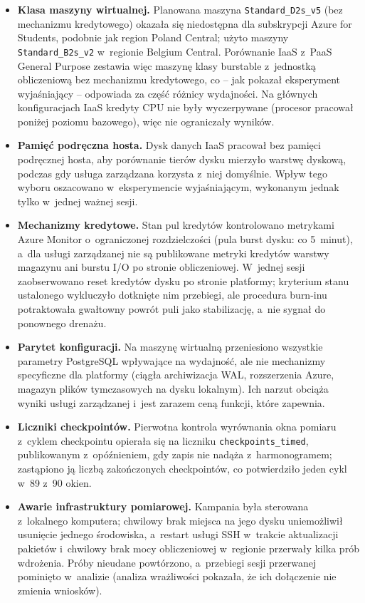 \begin{itemize}
  \item \textbf{Klasa maszyny wirtualnej.} Planowana maszyna \texttt{Standard\_D2s\_v5}
  (bez mechanizmu kredytowego) okazała się niedostępna dla subskrypcji Azure for Students,
  podobnie jak region Poland Central; użyto maszyny \texttt{Standard\_B2s\_v2} w~regionie
  Belgium Central. Porównanie IaaS z~PaaS General Purpose zestawia więc maszynę klasy
  burstable z~jednostką obliczeniową bez mechanizmu kredytowego, co -- jak pokazał
  eksperyment wyjaśniający -- odpowiada za część różnicy wydajności. Na głównych
  konfiguracjach IaaS kredyty CPU nie były wyczerpywane (procesor pracował poniżej poziomu
  bazowego), więc nie ograniczały wyników.
  \item \textbf{Pamięć podręczna hosta.} Dysk danych IaaS pracował bez pamięci podręcznej
  hosta, aby porównanie tierów dysku mierzyło warstwę dyskową, podczas gdy usługa zarządzana
  korzysta z~niej domyślnie. Wpływ tego wyboru oszacowano w~eksperymencie wyjaśniającym,
  wykonanym jednak tylko w~jednej ważnej sesji.
  \item \textbf{Mechanizmy kredytowe.} Stan pul kredytów kontrolowano metrykami Azure Monitor
  o~ograniczonej rozdzielczości (pula burst dysku: co 5~minut), a~dla usługi zarządzanej nie
  są publikowane metryki kredytów warstwy magazynu ani burstu I/O po stronie obliczeniowej.
  W~jednej sesji zaobserwowano reset kredytów dysku po stronie platformy; kryterium stanu
  ustalonego wykluczyło dotknięte nim przebiegi, ale procedura burn-inu potraktowała gwałtowny
  powrót puli jako stabilizację, a~nie sygnał do ponownego drenażu.
  \item \textbf{Parytet konfiguracji.} Na maszynę wirtualną przeniesiono wszystkie parametry
  PostgreSQL wpływające na wydajność, ale nie mechanizmy specyficzne dla platformy (ciągła
  archiwizacja WAL, rozszerzenia Azure, magazyn plików tymczasowych na dysku lokalnym). Ich
  narzut obciąża wyniki usługi zarządzanej i~jest zarazem ceną funkcji, które zapewnia.
  \item \textbf{Liczniki checkpointów.} Pierwotna kontrola wyrównania okna pomiaru z~cyklem
  checkpointu opierała się na liczniku \texttt{checkpoints\_timed}, publikowanym z~opóźnieniem,
  gdy zapis nie nadąża z~harmonogramem; zastąpiono ją liczbą zakończonych checkpointów, co
  potwierdziło jeden cykl w~89 z~90 okien.
  \item \textbf{Awarie infrastruktury pomiarowej.} Kampania była sterowana z~lokalnego
  komputera; chwilowy brak miejsca na jego dysku uniemożliwił usunięcie jednego środowiska,
  a~restart usługi SSH w~trakcie aktualizacji pakietów i~chwilowy brak mocy obliczeniowej
  w~regionie przerwały kilka prób wdrożenia. Próby nieudane powtórzono, a~przebiegi sesji
  przerwanej pominięto w~analizie (analiza wrażliwości pokazała, że ich dołączenie nie zmienia
  wniosków).
\end{itemize}

